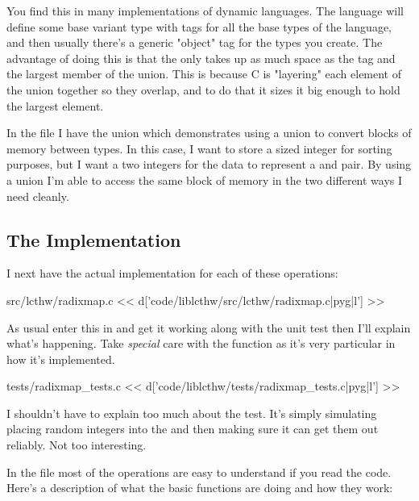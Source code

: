 You find this in many implementations of dynamic languages.  The language will
define some base variant type with tags for all the base types of the language,
and then usually there's a generic "object" tag for the types you create.
The advantage of doing this is that the  only takes up as much
space as the  tag and the largest member of the 
union.  This is because C is "layering" each element of the 
union together so they overlap, and to do that it sizes it big enough to
hold the largest element.

In the  file I have the  union which
demonstrates using a union to convert blocks of memory between types.  In
this case, I want to store a  sized integer for sorting
purposes, but I want a two  integers for the data to
represent a  and  pair.  By using a union I'm
able to access the same block of memory in the two different ways
I need cleanly.

\subsection{The Implementation}

I next have the actual  implementation for each of these
operations:

\begin{code}{src/lcthw/radixmap.c}
<< d['code/liblcthw/src/lcthw/radixmap.c|pyg|l'] >>
\end{code}

As usual enter this in and get it working along with the unit test
then I'll explain what's happening.  Take \emph{special} care with the
 function as it's very particular in how it's
implemented.

\begin{code}{tests/radixmap\_tests.c}
<< d['code/liblcthw/tests/radixmap_tests.c|pyg|l'] >>
\end{code}

I shouldn't have to explain too much about the test.  It's simply 
simulating placing random integers into the  and then
making sure it can get them out reliably.  Not too interesting.

In the  file most of the operations are easy to understand
if you read the code.   Here's a description of what the basic functions
are doing and how they work:

